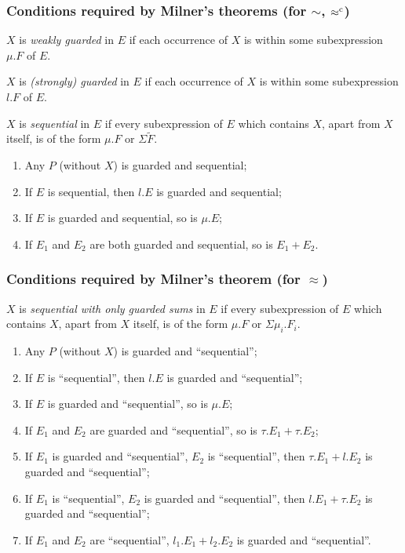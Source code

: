 \begin{frame}
\frametitle{Conditions required by Milner's theorems (for $\sim$, $\mathrel{\approx^{\mathrm{c}}}$)}
\begin{definition}
$X$ is \emph{weakly guarded} in $E$ if each occurrence of $X$ is
within some subexpression $\mu.F$ of $E$.
\end{definition}

\begin{definition}
$X$ is \emph{(strongly) guarded} in $E$ if each occurrence of $X$ is
within some subexpression $l.F$ of $E$.

$X$ is \emph{sequential} in $E$ if every subexpression of $E$ which
contains $X$, apart from $X$ itself, is of the form $\mu.F$ or
$\Sigma \tilde{F}$.
\begin{small}
\begin{enumerate}
\item Any $P$ (without $X$) is guarded and sequential;
\item If $E$ is sequential, then $l.E$ is guarded and sequential;
\item If $E$ is guarded and sequential, so is $\mu.E$;
\item If $E_1$ and $E_2$ are both guarded and sequential, so is $E_1 + E_2$.
\end{enumerate}
\end{small}
\end{definition}
\end{frame}

\begin{frame}
\frametitle{Conditions required by Milner's theorem (for $\approx$)}
\begin{definition}
$X$ is \emph{sequential with only guarded sums} in $E$ if every subexpression of $E$ which
contains $X$, apart from $X$ itself, is of the form $\mu.F$ or
$\Sigma \mu_i.F_i$.
\begin{small}
\begin{enumerate}
\item Any $P$ (without $X$) is guarded and ``sequential'';
\item If $E$ is ``sequential'', then $l.E$ is guarded and
  ``sequential'';
\item If $E$ is guarded and ``sequential'', so is $\mu.E$;
\item If $E_1$ and $E_2$ are guarded and ``sequential'', so is
  $\tau.E_1 + \tau.E_2$;
\item If $E_1$ is guarded and ``sequential'', $E_2$ is ``sequential'',
  then $\tau.E_1 + l.E_2$ is guarded and ``sequential'';
\item If $E_1$ is ``sequential'', $E_2$ is guarded and ``sequential'',
  then $l.E_1 + \tau.E_2$ is guarded and ``sequential'';
\item If $E_1$ and $E_2$ are ``sequential'', $l_1.E_1 +
  l_2.E_2$ is guarded and ``sequential''.
\end{enumerate}
\end{small}
\end{definition}
\end{frame}

